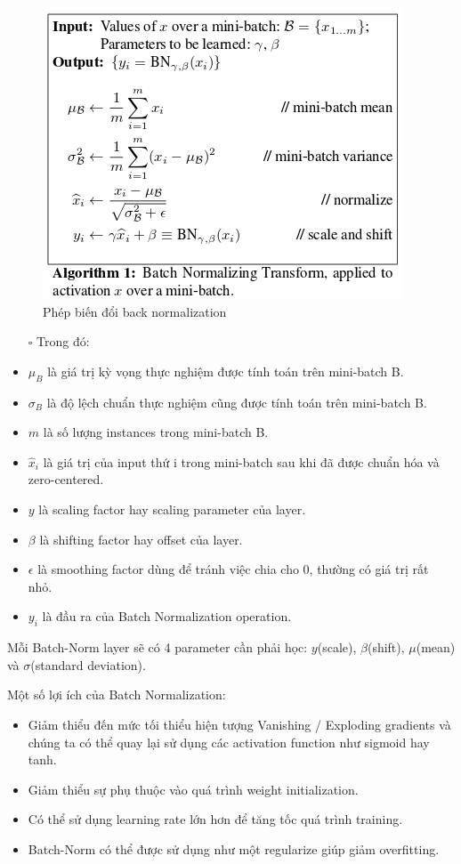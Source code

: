 \FloatBarrier
\begin{figure}[htp]
\begin{center}
\includegraphics[scale=0.8]{chap2/c2_figs/back_norm.png}
\end{center}
\caption{Phép biến đổi back normalization \cite{ioffe2015batch}}
\label{fig:back_norm}
\end{figure}
\FloatBarrier

\begin{itemize}
\item[$\square$] Trong đó:
\item $ \mu _B$ là giá trị kỳ vọng thực nghiệm được tính toán trên mini-batch B.
\item $\sigma_B$ là độ lệch chuẩn thực nghiệm cũng được tính toán trên mini-batch B.
\item $m$ là số lượng instances trong mini-batch B.
\item $\hat{x}_i $ là giá trị của input thứ i trong mini-batch sau khi đã được chuẩn hóa và zero-centered.
\item $y$ là scaling factor hay scaling parameter của layer.
\item $\beta$ là shifting factor hay offset của layer.
\item $\epsilon$ là smoothing factor dùng để tránh việc chia cho 0, thường có giá trị rất nhỏ.
\item $y_i$ là đầu ra của Batch Normalization operation.
\end{itemize}
Mỗi Batch-Norm layer sẽ có 4 parameter cần phải học:  $y$(scale),  $\beta$(shift),  $ \mu$(mean) và $\sigma$(standard deviation).

Một số lợi ích của Batch Normalization:
\begin{itemize}
\item Giảm thiểu đến mức tối thiểu hiện tượng Vanishing / Exploding gradients và chúng ta có thể quay lại sử dụng các activation function như sigmoid hay tanh.
\item Giảm thiểu sự phụ thuộc vào quá trình weight initialization.
\item Có thể sử dụng learning rate lớn hơn để tăng tốc quá trình training.
\item Batch-Norm có thể được sử dụng như một regularize giúp giảm overfitting.
\end{itemize}


